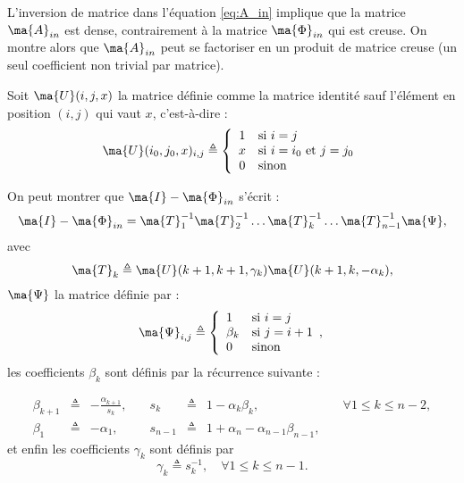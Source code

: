 L'inversion de matrice dans l'équation \eqref{eq:A_in} implique que la matrice $\ma{A}_{in}$ est dense, contrairement à la matrice $\ma{\Phi}_{in}$ qui est creuse. On montre alors que $\ma{A}_{in}$ peut se factoriser en un produit de matrice creuse (un seul coefficient non trivial par matrice).

Soit $\ma{U}(i,j,x)$ la matrice définie comme la matrice identité sauf l'élément en position $(i,j)$ qui vaut $x$, c'est-à-dire :
 \begin{equation}
	\ma{U}(i_0,j_0,x)_{i,j}  \triangleq
	\left \{
	\begin{array}{cl}
	1 & \mbox{si}~i=j \\
	x& \mbox{si}~i=i_0 ~\mbox{et}~j=j_0\\
	0 & \mbox{sinon}\\
	\end{array}
	\right .
	\label{eq:Uijx}
\end{equation}

On peut montrer que $\ma{I}-\ma{\Phi}_{in}$ s'écrit :
\begin{equation}
	\ma{I}-\ma{\Phi}_{in} = \ma{T}_1^{-1}\ma{T}_2^{-1}\ldots \ma{T}_k^{-1} \ldots \ma{T}_{n-1}^{-1}\ma{\Psi},
\end{equation}
avec
\begin{equation}\label{eq:T_LGS}
	\ma{T}_k  \triangleq  \ma{U}(k+1,k+1,\gamma_k)\ma{U}(k+1,k,-\alpha_k),
\end{equation}
$\ma{\Psi}$ la matrice définie par :
\begin{equation}
	\ma{\Psi}_{i,j} \triangleq  
	\left \{
	\begin{array}{ll}
		1 & \mbox{si}~i=j \\
		\beta_k& \mbox{si}~j=i+1\\
		0 & \mbox{sinon}\\
	\end{array}
	,\right .
\end{equation}
les coefficients $\beta_k$ sont définis par la récurrence suivante :

\begin{equation*}
	\begin{array}{rclrclr}
		\beta_{k+1}&\triangleq& -\frac{\alpha_{k+1}}{s_k},\quad  &s_k&\triangleq& 1-\alpha_k\beta_k, &\quad \forall 1\leq k \leq n-2,\\
		\beta_1&\triangleq&-\alpha_1, \quad &s_{n-1} &\triangleq& 1+\alpha_n-\alpha_{n-1}\beta_{n-1},&
	\end{array}
\end{equation*}
et enfin les coefficients $\gamma_k$ sont définis par
\begin{equation}
	\gamma_k\triangleq s_k^{-1}, \quad \forall 1\leq k \leq n-1.
\end{equation}

